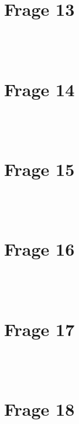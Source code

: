 \documentclass[a4paper]{scrartcl}
\begin{document}
~\\
~\\
\section*{Frage 13}

~\\
~\\
\section*{Frage 14}

~\\
~\\
\section*{Frage 15}

~\\
~\\
\section*{Frage 16}

~\\
~\\
\section*{Frage 17}

~\\
~\\
\section*{Frage 18}

~\\
~\\
\end{document}

